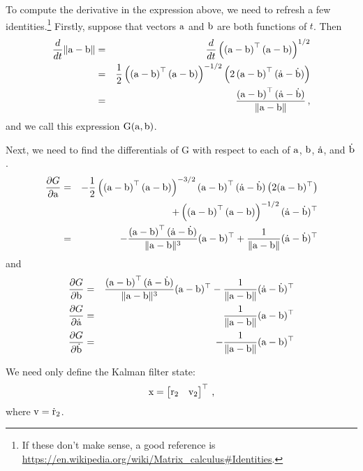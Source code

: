 \documentclass[12pt]{article}
\begin{document}
To compute the derivative in the expression above, we need to refresh a few identities.\footnote{If these don't make sense, a good reference is \url{https://en.wikipedia.org/wiki/Matrix_calculus\#Identities}.} Firstly, suppose that vectors $\mathrm{a}$ and $\mathrm{b}$ are both functions of $t$. Then
\begin{eqnarray}
\frac{d}{dt} \| \mathrm{a} - \mathrm{b} \| &=& \frac{d}{dt} \left( \left(\mathrm{a} - \mathrm{b}\right)^\top\left(\mathrm{a} - \mathrm{b}\right) \right)^{1/2} \nonumber \\
&=& \frac{1}{2} \left( \left(\mathrm{a} - \mathrm{b}\right)^\top\left(\mathrm{a} - \mathrm{b}\right) \right)^{-1/2} \left(2 \left(\mathrm{a} - \mathrm{b}\right)^\top(\dot{\mathrm{a}} - \dot{\mathrm{b}}) \right) \nonumber \\
&=& \frac{\left(\mathrm{a} - \mathrm{b}\right)^\top(\dot{\mathrm{a}} - \dot{\mathrm{b}})}{\|\mathrm{a} - \mathrm{b}\|}\,\text{,}
\end{eqnarray}
and we call this expression $\mathrm{G}(\mathrm{a},\mathrm{b})$.

Next, we need to find the differentials of $\mathrm{G}$ with respect to each of $\mathrm{a}$, $\mathrm{b}$, $\dot{\mathrm{a}}$, and $\dot{\mathrm{b}}$.
\begin{eqnarray}
\frac{\partial G}{\partial\veca} &=& -\frac{1}{2} \left( \left(\veca - \vecb\right)^\top\left(\veca - \vecb\right) \right)^{-3/2} \left(\veca - \vecb\right)^\top(\dot{\veca} - \dot{\vecb}) \left(2 (\veca - \vecb)^\top \right) \nonumber\\
&& + \left( \left(\veca - \vecb\right)^\top\left(\veca - \vecb\right) \right)^{-1/2} (\dot{\veca} - \dot{\vecb})^\top \nonumber \\
%
&=& -\frac{\left(\veca - \vecb\right)^\top(\dot{\veca} - \dot{\vecb})}{\|\veca - \vecb\|^3}(\veca - \vecb)^\top + \frac{1}{\|\veca - \vecb\|} (\dot\veca - \dot\vecb)^\top
\end{eqnarray}
and
\begin{eqnarray}
\frac{\partial G}{\partial\mathrm{b}} &=& \frac{\left(\mathrm{a} - \mathrm{b}\right)^\top(\dot{\mathrm{a}} - \dot{\mathrm{b}})}{\|\mathrm{a} - \mathrm{b}\|^3}(\mathrm{a} - \mathrm{b})^\top - \frac{1}{\|\mathrm{a} - \mathrm{b}\|} (\dot{\mathrm{a}} - \dot{\mathrm{b}})^\top \\
\frac{\partial G}{\partial\dot{\mathrm{a}}} &=& \frac{1}{\|\mathrm{a} - \mathrm{b}\|} (\mathrm{a} - \mathrm{b})^\top \\
\frac{\partial G}{\partial\dot{\mathrm{b}}} &=& -\frac{1}{\|\mathrm{a} - \mathrm{b}\|} (\mathrm{a} - \mathrm{b})^\top
\end{eqnarray}

We need only define the Kalman filter state:
\begin{equation}
\mathrm{x} = \begin{bmatrix} \mathrm{r}_2 & \mathrm{v}_2 \end{bmatrix}^\top\,\text{,}
\end{equation}
where $\mathrm{v} = \dot{\mathrm{r}}_2$.
\end{document}

